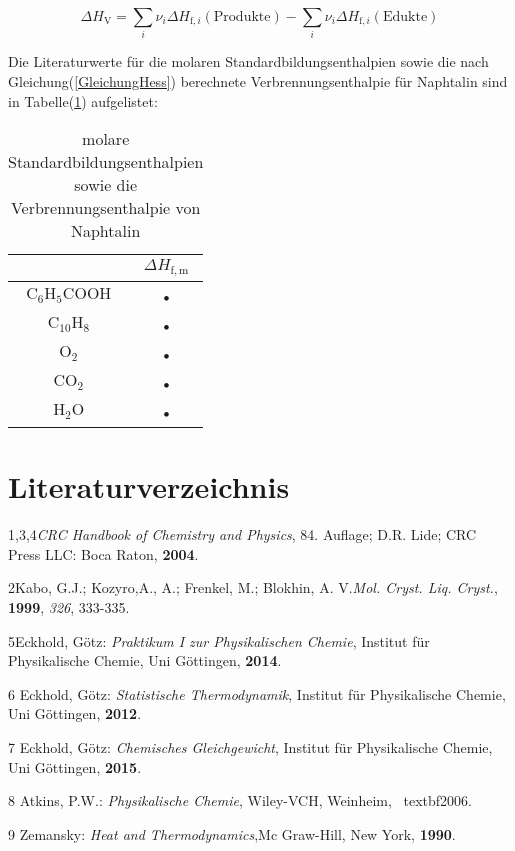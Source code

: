 \documentclass[12pt,a4paper,titlepage,headinclude,bibtotoc]{scrartcl}
\begin{document}
\begin{equation} \label{GleichungHess}
\Delta H_\mathrm{V} = \sum_i \nu_i\Delta H_{\mathrm{f},i}\mathrm{(Produkte)} - \sum_i \nu_i\Delta H_{\mathrm{f},i}\mathrm{(Edukte)}
\end{equation}

Die Literaturwerte für die molaren Standardbildungsenthalpien sowie die nach Gleichung(\ref{GleichungHess}) berechnete Verbrennungsenthalpie für Naphtalin sind in Tabelle(\ref{TABELLELiteraturwerte Bildungsenthalpien}) aufgelistet:\\

\begin{table} \label{TABELLELiteraturwerte Bildungsenthalpien}
\caption{molare Standardbildungsenthalpien sowie die Verbrennungsenthalpie von Naphtalin}
\begin{tabular}{c|c}

  & $\Delta H_{\mathrm{f,m}}$ \\ 
 \hline 
 $\mathrm{C}_6\mathrm{H}_5\mathrm{COOH}$ & • \\ 
 \hline 
 $\mathrm{C}_{10}\mathrm{H}_8$ & • \\
 \hline 
 $\mathrm{O}_2$ & • \\ 
 \hline 
 $\mathrm{CO}_2$ & • \\ 
 \hline 
 $\mathrm{H}_2\mathrm{O}$ & • \\ 
 \end{tabular}  
\end{table}



\section{Literaturverzeichnis}

1,3,4\quad \emph{CRC Handbook of Chemistry and Physics}, 84. Auflage; D.R. Lide; CRC Press LLC: Boca Raton, \textbf{2004}.

2\quad Kabo, G.J.; Kozyro,A., A.; Frenkel, M.; Blokhin, A. V.\emph{Mol. Cryst. Liq. Cryst.}, \textbf{1999}, \emph{326}, 333-335.

5\quad Eckhold, Götz: \emph{Praktikum I zur Physikalischen Chemie}, Institut für Physikalische Chemie, Uni Göttingen, \textbf{2014}.

\vspace{0,5 cm}

6 \quad Eckhold, Götz: \emph{Statistische Thermodynamik}, Institut für Physikalische Chemie, Uni Göttingen, \textbf{2012}.

\vspace{0,5cm}

7 \quad Eckhold, Götz: \emph{Chemisches Gleichgewicht}, Institut für Physikalische Chemie, Uni Göttingen, \textbf{2015}.\\

\vspace{0,5cm}

8 \quad Atkins, P.W.: \emph{Physikalische Chemie}, Wiley-VCH, Weinheim, \
 textbf{2006}.\\

\vspace{0,5cm}

9 \quad Zemansky: \emph{Heat and Thermodynamics},Mc Graw-Hill, New York, \textbf{1990}.\\
\end{document}
